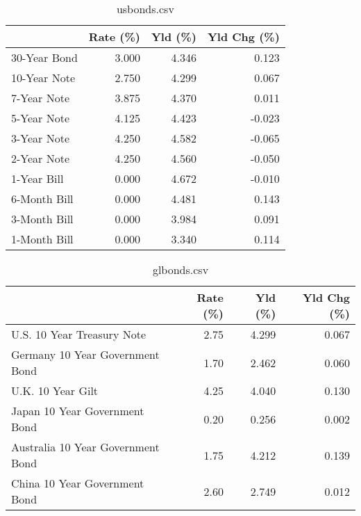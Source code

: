 \documentclass{article}%
\begin{document}
%


\begin{table}[htbp]%
\caption{usbonds.csv}%
\centering%
\begin{adjustbox}{width=1\textwidth}%
\begin{tabular}{lrrr}
\toprule
             &  Rate (\%) &  Yld (\%) &  Yld Chg (\%) \\
\midrule
30-Year Bond &     3.000 &    4.346 &        0.123 \\
10-Year Note &     2.750 &    4.299 &        0.067 \\
 7-Year Note &     3.875 &    4.370 &        0.011 \\
 5-Year Note &     4.125 &    4.423 &       -0.023 \\
 3-Year Note &     4.250 &    4.582 &       -0.065 \\
 2-Year Note &     4.250 &    4.560 &       -0.050 \\
 1-Year Bill &     0.000 &    4.672 &       -0.010 \\
6-Month Bill &     0.000 &    4.481 &        0.143 \\
3-Month Bill &     0.000 &    3.984 &        0.091 \\
1-Month Bill &     0.000 &    3.340 &        0.114 \\
\bottomrule
\end{tabular}
%
\end{adjustbox}%
\end{table}

%


\begin{table}[htbp]%
\caption{glbonds.csv}%
\centering%
\begin{adjustbox}{width=1\textwidth}%
\begin{tabular}{lrrr}
\toprule
                                  &  Rate (\%) &  Yld (\%) &  Yld Chg (\%) \\
\midrule
       U.S. 10 Year Treasury Note &      2.75 &    4.299 &        0.067 \\
  Germany 10 Year Government Bond &      1.70 &    2.462 &        0.060 \\
                U.K. 10 Year Gilt &      4.25 &    4.040 &        0.130 \\
    Japan 10 Year Government Bond &      0.20 &    0.256 &        0.002 \\
Australia 10 Year Government Bond &      1.75 &    4.212 &        0.139 \\
    China 10 Year Government Bond &      2.60 &    2.749 &        0.012 \\
\bottomrule
\end{tabular}
%
\end{adjustbox}%
\end{table}
\end{document}
